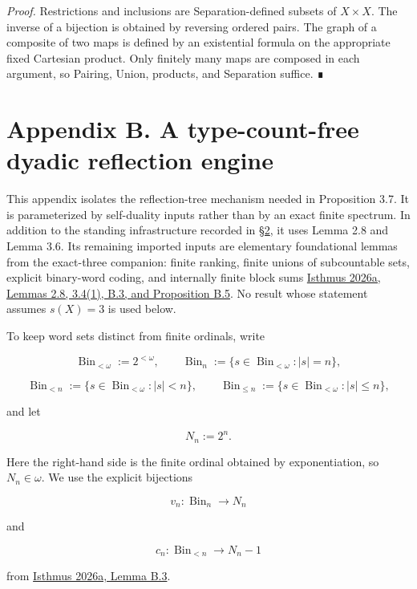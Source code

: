 \documentclass[
  english,
  11pt,
  reqno]{amsart}
\begin{document}
\emph{Proof.} Restrictions and inclusions are Separation-defined subsets
of \(X\times X\). The inverse of a bijection is obtained by reversing
ordered pairs. The graph of a composite of two maps is defined by an
existential formula on the appropriate fixed Cartesian product. Only
finitely many maps are composed in each argument, so Pairing, Union,
products, and Separation suffice. ∎

\protect{}\label{app:dyadic-engine}

\section{Appendix B. A type-count-free dyadic reflection
engine}\label{appendix-b.-a-type-count-free-dyadic-reflection-engine}

This appendix isolates the reflection-tree mechanism needed in
Proposition 3.7. It is parameterized by self-duality inputs rather than
by an exact finite spectrum. In addition to the standing infrastructure
recorded in \hyperref[sec:formal-setting]{§2}, it uses Lemma 2.8 and
Lemma 3.6. Its remaining imported inputs are elementary foundational
lemmas from the exact-three companion: finite ranking, finite unions of
subcountable sets, explicit binary-word coding, and internally finite
block sums \hyperref[ref:isthmus2026a]{Isthmus 2026a, Lemmas 2.8,
3.4(1), B.3, and Proposition B.5}. No result whose statement assumes
\(s(X)=3\) is used below.

To keep word sets distinct from finite ordinals, write

\[
\operatorname{Bin}_{<\omega}
:=
2^{<\omega},
\qquad
\operatorname{Bin}_n
:=
\{s\in\operatorname{Bin}_{<\omega}:|s|=n\},
\]

\[
\operatorname{Bin}_{<n}
:=
\{s\in\operatorname{Bin}_{<\omega}:|s|<n\},
\qquad
\operatorname{Bin}_{\le n}
:=
\{s\in\operatorname{Bin}_{<\omega}:|s|\le n\},
\]

and let

\[
N_n:=2^n.
\]

Here the right-hand side is the finite ordinal obtained by
exponentiation, so \(N_n\in\omega\). We use the explicit bijections

\[
v_n:\operatorname{Bin}_n\longrightarrow N_n
\]

and

\[
c_n:\operatorname{Bin}_{<n}\longrightarrow N_n-1
\]

from \hyperref[ref:isthmus2026a]{Isthmus 2026a, Lemma B.3}.
\end{document}
